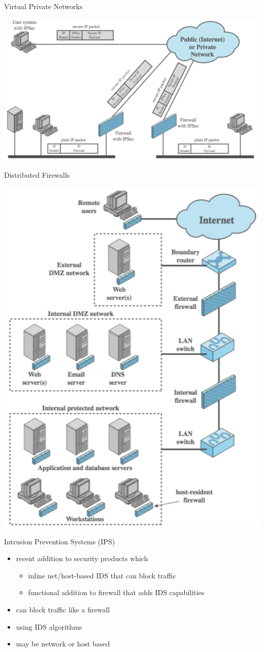 \documentclass{beamer}
\begin{document}
\begin{frame}{Virtual Private Networks}
  \begin{center}
    \includegraphics[width=1\linewidth]{vpn}
  \end{center}
\end{frame}

\begin{frame}{Distributed Firewalls}
  \begin{center}
    \includegraphics[width=0.5\linewidth]{distributed-firewalls}
  \end{center}
\end{frame}

\begin{frame}{Intrusion Prevention Systems (IPS)}
  \begin{itemize}
  \item recent addition to security products which 
    \begin{itemize}
    \item inline net/host-based IDS that can block traffic 
    \item functional addition to firewall that adds IDS 
      capabilities 
    \end{itemize}
  \item can block traffic like a firewall 
  \item using IDS algorithms 
  \item may be network or host based
  \end{itemize}
\end{frame}
\end{document}
